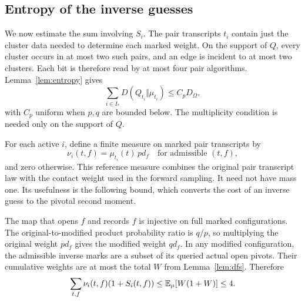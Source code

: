 \subsection{Entropy of the inverse guesses}

We now estimate the sum involving $S_i$. The pair transcripts $t_i$
contain just the cluster data needed to determine each marked weight.
On the support of $Q$, every cluster occurs in at most two such pairs,
and an edge is incident to at most two clusters. Each bit is therefore
read by at most four pair algorithms. Lemma~\ref{lem:entropy} gives
\begin{equation}\label{eq:interpolation-pair-entropy}
 \sum_{i\in I_*}D(Q_{t_i}\Vert\mu_{t_i})\le C_pD_\Omega,
\end{equation}
with $C_p$ uniform when $p,q$ are bounded below. The multiplicity
condition is needed only on the support of $Q$.

For each active $i$, define a finite measure on marked pair transcripts by
\[
 \nu_i(t,f)=\mu_{t_i}(t)\,pd_f
 \quad\text{for admissible }(t,f),
\]
and zero otherwise. This reference measure combines the original pair
transcript law with the contact weight used in the forward sampling.
It need not have mass one. Its usefulness is the following bound, which
converts the cost of an inverse guess to the pivotal second moment.

The map that opens $f$ and records $f$ is injective on full marked
configurations. The original-to-modified product probability ratio is
$q/p$, so multiplying the original weight $pd_f$ gives the modified
weight $qd_f$. In any modified configuration, the admissible inverse
marks are a subset of its queried actual open pivots. Their cumulative
weights are at most the total $W$ from Lemma~\ref{lem:dfs}. Therefore
\begin{equation}\label{eq:interpolation-contact-measure}
 \sum_{t,f}\nu_i(t,f)(1+S_i(t,f))
 \le\mathbb E_\mu[W(1+W)]\le4.
\end{equation}

